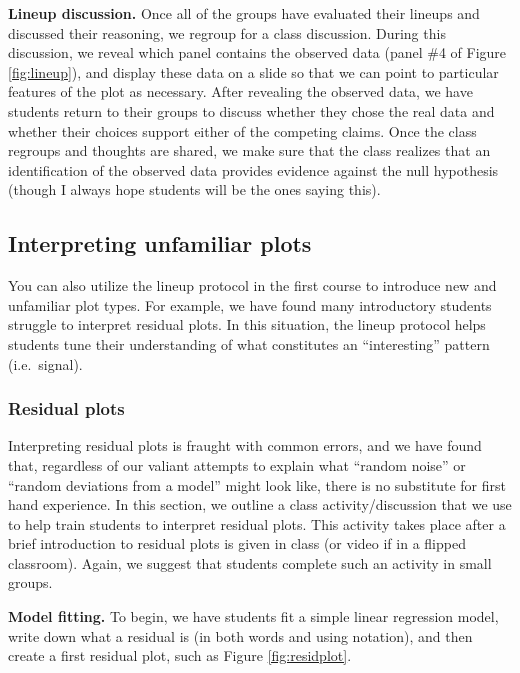 \documentclass[12pt]{article}
\begin{document}
\textbf{Lineup discussion.} Once all of the groups have evaluated their
lineups and discussed their reasoning, we regroup for a class
discussion. During this discussion, we reveal which panel contains the
observed data (panel \#4 of Figure \ref{fig:lineup}), and display these
data on a slide so that we can point to particular features of the plot
as necessary. After revealing the observed data, we have students return
to their groups to discuss whether they chose the real data and whether
their choices support either of the competing claims. Once the class
regroups and thoughts are shared, we make sure that the class realizes
that an identification of the observed data provides evidence against
the null hypothesis (though I always hope students will be the ones
saying this).

\hypertarget{interpreting-unfamiliar-plots}{%
\subsection{Interpreting unfamiliar
plots}\label{interpreting-unfamiliar-plots}}

You can also utilize the lineup protocol in the first course to
introduce new and unfamiliar plot types. For example, we have found many
introductory students struggle to interpret residual plots. In this
situation, the lineup protocol helps students tune their understanding
of what constitutes an ``interesting'' pattern (i.e.~signal).

\hypertarget{residual-plots}{%
\subsubsection{Residual plots}\label{residual-plots}}

Interpreting residual plots is fraught with common errors, and we have
found that, regardless of our valiant attempts to explain what ``random
noise'' or ``random deviations from a model'' might look like, there is
no substitute for first hand experience. In this section, we outline a
class activity/discussion that we use to help train students to
interpret residual plots. This activity takes place after a brief
introduction to residual plots is given in class (or video if in a
flipped classroom). Again, we suggest that students complete such an
activity in small groups.

\textbf{Model fitting.} To begin, we have students fit a simple linear
regression model, write down what a residual is (in both words and using
notation), and then create a first residual plot, such as Figure
\ref{fig:residplot}.
\end{document}
